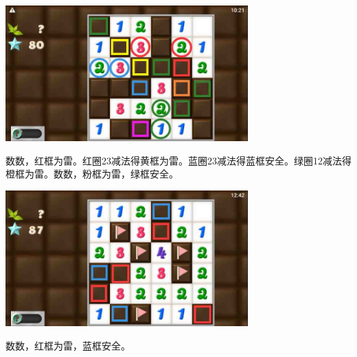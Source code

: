 \begin{center}
    \includegraphics[width=0.7\textwidth]{puzzlelow/237-4.jpg}
\end{center}
数数，红框为雷。红圈23减法得黄框为雷。蓝圈23减法得蓝框安全。绿圈12减法得橙框为雷。数数，粉框为雷，绿框安全。
\begin{center}
    \includegraphics[width=0.7\textwidth]{puzzlelow/237-5.jpg}
\end{center}
数数，红框为雷，蓝框安全。

